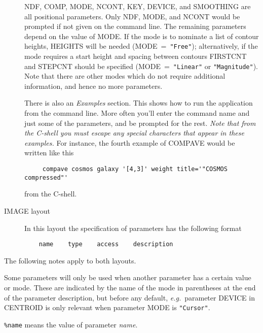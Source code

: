 \documentclass[twoside,11pt]{article}
\newcommand{\htmlref}[2]{#1}
\begin{document}
\begin{description}
NDF, COMP, MODE, NCONT, KEY, DEVICE, and SMOOTHING are all positional
parameters.  Only NDF, MODE, and NCONT would be prompted if not given
on the command line.  The remaining parameters depend on the value of
MODE.  If the mode is to nominate a list of contour heights, HEIGHTS
will be needed (MODE~=~{\tt "Free"}); alternatively, if the mode requires a
start height and spacing between contours FIRSTCNT and STEPCNT should be
specified (MODE~=~{\tt "Linear"} or {\tt "Magnitude"}).  Note that there
are other modes which do not require additional information, and hence no
more parameters.

There is also an {\em Examples\/} section. \label{ap:example}  This
shows how to run the application from the command line.  More often
you'll enter the command name and just some of the parameters, and be
prompted for the rest. {\em Note that from the C-shell you must escape
any special characters that appear in these examples.} For instance,
the fourth example of COMPAVE would be written like this

\begin{verbatim}
     compave cosmos galaxy '[4,3]' weight title='"COSMOS compressed"'
\end{verbatim}

from the C-shell.

\item [IMAGE layout]
In this layout the specification of parameters has the following format
\begin{verbatim}
    name    type    access    description
\end{verbatim}
\end{description}
\medskip

The following notes apply to both layouts.

Some parameters will only be used when another parameter has a certain
value or mode. These are indicated by the name of the mode in
parentheses at the end of the parameter description, but before any
default, {\it{e.g.}}\ parameter DEVICE in \htmlref{CENTROID}{CENTROID}
is only relevant when parameter MODE is {\tt "Cursor"}.

{\tt \%name} means the value of parameter {\it name}.
\end{document}
